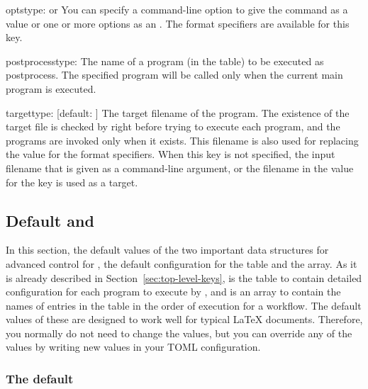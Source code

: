 \documentclass[draft]{llmk-doc}
\begin{document}
\begin{confkey}{opts}{type:  or }
You can specify a command-line option to give the command as a 
value or one or more options as an . The format
specifiers are available for this key.
\end{confkey}

\begin{confkey}{postprocess}{type: }
The name of a program (in the  table) to be executed as
postprocess. The specified program will be called only when the current main
program is executed.
\end{confkey}

\begin{confkey}{target}{type: }[default: ]
The target filename of the program. The existence of the target file is checked
by  right before trying to execute each program, and the programs
are invoked only when it exists. This filename is also used for replacing the
value for the format specifiers. When this key is not specified, the input
filename that is given as a command-line argument, or the filename in the value
for the  key is used as a target.
\end{confkey}

\subsection{Default  and }

In this section, the default values of the two important data structures for
advanced control for , \ie the default configuration for the
 table and the  array. As it is already described
in Section~\ref{sec:top-level-keys},  is the table to contain
detailed configuration for each program to execute by , and
 is an array to contain the names of entries in the
 table in the order of execution for a workflow. The default
values of these are designed to work well for typical {\LaTeX} documents.
Therefore, you normally do not need to change the values, but you can override
any of the values by writing new values in your TOML configuration.

\subsubsection{The default }
\label{sec:default-programs}
\end{document}
